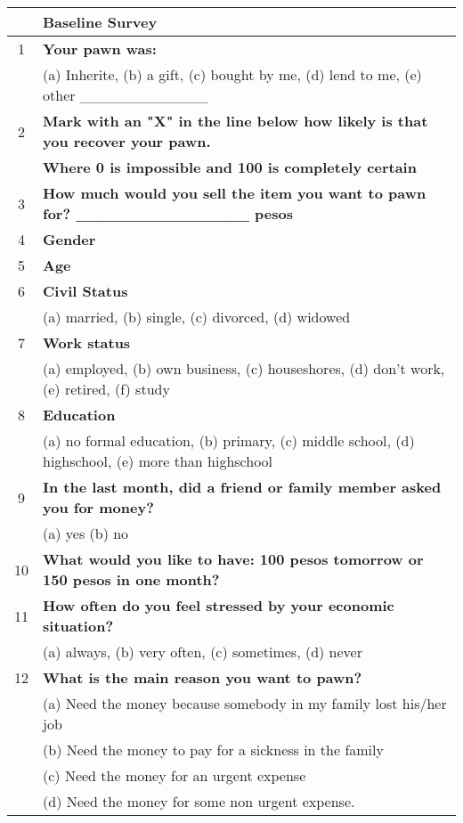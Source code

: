 \begin{tabular}{cl}
\toprule
      & \textbf{Baseline Survey} \\
\midrule
\midrule
1     & \textbf{Your pawn was:} \\
      & (a) Inherite, (b) a gift, (c) bought by me, (d) lend to me, (e) other \_\_\_\_\_\_\_\_\_\_\_\_ \\
2     & \textbf{Mark with an "X" in the line below how likely is that you recover your pawn. } \\
      & \textbf{Where 0 is impossible and 100 is completely certain} \\
3     & \textbf{How much would you sell the item you want to pawn for?       \_\_\_\_\_\_\_\_\_\_\_\_\_\_ pesos} \\
4     & \textbf{Gender      } \\
5     & \textbf{Age} \\
6     & \textbf{Civil Status } \\
      & (a) married, (b) single, (c) divorced, (d) widowed \\
7     & \textbf{Work status} \\
      & (a) employed, (b) own business, (c) houseshores, (d) don't work, (e) retired, (f) study \\
8     & \textbf{Education} \\
      & (a) no formal education, (b) primary, (c) middle school, (d) highschool, (e) more than highschool \\
9     & \textbf{In the last month, did a friend or family member asked you for money?} \\
      & (a) yes  (b) no \\
10    & \textbf{What would you like to have: 100 pesos tomorrow or 150 pesos in one month?} \\
11    & \textbf{How often do you feel stressed by your economic situation?} \\
      & (a) always, (b) very often, (c) sometimes, (d) never \\
12    & \textbf{What is the main reason you want to pawn?} \\
      & (a) Need the money because somebody in my family lost his/her job \\
      & (b) Need the money to pay for a sickness in the family \\
      & (c) Need the money for an urgent expense \\
      & (d) Need the money for some non urgent expense. \\

\end{tabular}
